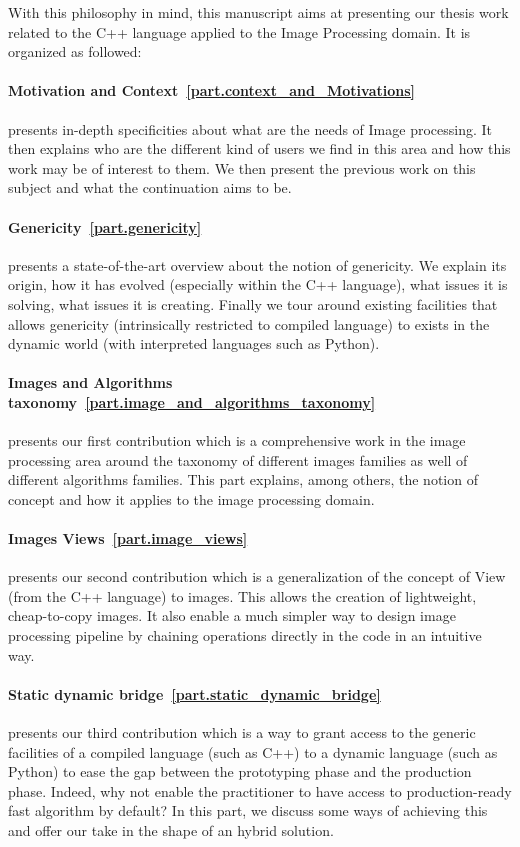 With this philosophy in mind, this manuscript aims at presenting our thesis work related to the C++ language applied to
the Image Processing domain. It is organized as followed:

\paragraph{Motivation and Context~\ref{part.context_and_Motivations}} presents in-depth specificities about what are the
needs of Image processing. It then explains who are the different kind of users we find in this area and how this work
may be of interest to them. We then present the previous work on this subject and what the continuation aims to be.

\paragraph{Genericity~\ref{part.genericity}} presents a state-of-the-art overview about the notion of genericity. We
explain its origin, how it has evolved (especially within the C++ language), what issues it is solving, what issues it
is creating. Finally we tour around existing facilities that allows genericity (intrinsically restricted to compiled
language) to exists in the dynamic world (with interpreted languages such as Python).

\paragraph{Images and Algorithms taxonomy~\ref{part.image_and_algorithms_taxonomy}} presents our first contribution
which is a comprehensive work in the image processing area around the taxonomy of different images families as well of
different algorithms families. This part explains, among others, the notion of concept and how it applies to the
image processing domain.

\paragraph{Images Views~\ref{part.image_views}} presents our second contribution which is a generalization of the
concept of View (from the C++ language) to images. This allows the creation of lightweight, cheap-to-copy images. It
also enable a much simpler way to design image processing pipeline by chaining operations directly in the code in an
intuitive way.

\paragraph{Static dynamic bridge~\ref{part.static_dynamic_bridge}} presents our third contribution which is a way to
grant access to the generic facilities of a compiled language (such as C++) to a dynamic language (such as Python) to
ease the gap between the prototyping phase and the production phase. Indeed, why not enable the practitioner to have
access to production-ready fast algorithm by default? In this part, we discuss some ways of achieving this and offer our
take in the shape of an hybrid solution.

